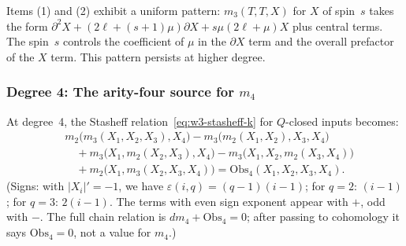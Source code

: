 \begin{remark}[Pattern in $m_3$]
\label{rem:m3-pattern}
Items (1) and (2) exhibit a uniform pattern: $m_3(T,T,X)$ for $X$ of
spin~$s$ takes the form $\partial^2 X + (2\ell + (s+1)\mu)\partial X + s\mu(2\ell + \mu) X$
plus central terms. The spin~$s$ controls the coefficient of $\mu$ in the
$\partial X$ term and the overall prefactor of the $X$ term.
This pattern persists at higher degree.
\end{remark}

\subsubsection{Degree 4: The arity-four source for $m_4$}

At degree~4, the Stasheff relation~\eqref{eq:w3-stasheff-k} for
$Q$-closed inputs becomes:
\begin{equation}
\label{eq:w3-stasheff-4}
\begin{split}
&m_2\bigl(m_3(X_1, X_2, X_3), X_4\bigr)
- m_3\bigl(m_2(X_1, X_2), X_3, X_4\bigr)\\
&\quad + m_3\bigl(X_1, m_2(X_2, X_3), X_4\bigr)
- m_3\bigl(X_1, X_2, m_2(X_3, X_4)\bigr)\\
&\quad + m_2\bigl(X_1, m_3(X_2, X_3, X_4)\bigr)
= \mathrm{Obs}_4(X_1,X_2,X_3,X_4).
\end{split}
\end{equation}
(Signs: with $|X_i|' = -1$, we have $\varepsilon(i,q) = (q-1)(i-1)$;
for $q=2$: $(i-1)$; for $q=3$: $2(i-1)$. The terms with even sign
exponent appear with $+$, odd with $-$. The full chain relation is
\(d m_4+\mathrm{Obs}_4=0\); after passing to cohomology it says
\(\mathrm{Obs}_4=0\), not a value for \(m_4\).)


